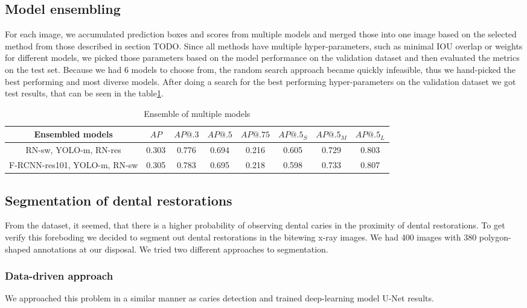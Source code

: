 \subsection{Model ensembling}
For each image, we accumulated prediction boxes and scores from multiple models and merged those into one image based on the selected method from those described in section TODO. Since all methods have multiple hyper-parameters, such as minimal IOU overlap or weights for different models, we picked those parameters based on the model performance on the validation dataset and then evaluated the metrics on the test set. Because we had 6 models to choose from, the random search approach became quickly infeasible, thus we hand-picked the best performing and most diverse models. After doing a search for the best performing hyper-parameters on the validation dataset we got test results, that can be seen in the table\ref{tab:model_ensembling}.
\begin{table}
    \begin{tabular}{c||c|c|c|c|c|c|c}
        Ensembled models & $AP$  & $AP@.3$ & $AP@.5$ & $AP@.75$ & $AP@.5_S$ & $AP@.5_M$ & $AP@.5_L$ \\ \hline \hline
        RN-sw, YOLO-m, RN-res & 0.303& 0.776 & 0.694 & 0.216 & 0.605 & 0.729 & 0.803 \\ \hline
        F-RCNN-res101, YOLO-m, RN-sw & 0.305 & 0.783 & 0.695 & 0.218 & 0.598 & 0.733 & 0.807 \\


    \end{tabular}
    \caption{Ensemble of multiple models}
    \label{tab:model_ensembling}
\end{table}

\subsection{Segmentation of dental restorations}
From the dataset, it seemed, that there is a higher probability of observing dental caries in the proximity of dental restorations. To get verify this foreboding we decided to segment out dental restorations in the bitewing x-ray images. We had 400 images with 380 polygon-shaped annotations at our disposal. We tried two different approaches to segmentation. 

\subsubsection{Data-driven approach}
We approached this problem in a similar manner as caries detection and trained deep-learning model U-Net \TODO results.


